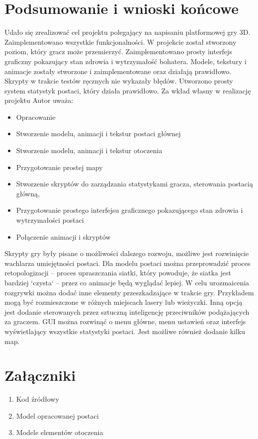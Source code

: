 \documentclass[12pt,twoside]{article}
\begin{document}
\clearpage
\section{Podsumowanie i wnioski końcowe}

Udało się zrealizować cel projektu polegający na napisaniu platformowej gry 3D.
Zaimplementowano wszystkie funkcjonalności. W projekcie został stworzony poziom,
który gracz może przemierzyć. Zaimplementowano prosty interfejs graficzny
pokazujący stan zdrowia i wytrzymałość bohatera. Modele, tekstury i animacje
zostały stworzone i zaimplementowane oraz działają prawidłowo. Skrypty w trakcie
testów ręcznych nie wykazały błędów. Utworzono prosty system statystyk postaci,
który działa prawidłowo. 
Za wkład własny w realizację projektu Autor uważa:
\begin{itemize}
\item Opracowanie
\item Stworzenie modelu, animacji i tekstur postaci głównej
\item Stworzenie modelu, animacji i tekstur otoczenia
\item Przygotowanie prostej mapy 
\item Stworzenie skryptów do zarządzania statystykami gracza, sterowania postacią główną, 
\item Przygotowanie prostego interfejsu graficznego pokazującego stan zdrowia i wytrzymałości postaci
\item Połączenie animacji i skryptów 
\end{itemize}

Skrypty gry były pisane o możliwości dalszego rozwoju, możliwe jest rozwinięcie
wachlarza umiejętności postaci.  Dla modelu postaci można przeprowadzić proces
retopologizacji -- proces upraszczania siatki, który powoduje, że siatka jest
bardziej `czysta` -- przez co animacje będą wyglądać lepiej. W celu urozmaicenia
rozgrywki można dodać inne elementy przeszkadzające w trakcie gry. Przykładem
mogą być rozmieszczone w różnych miejscach lasery lub wieżyczki. Inną opcją jest
dodanie sterowanych przez sztuczną inteligencję przeciwników podążających za
graczem. GUI można rozwinąć o menu główne, menu ustawień oraz interfejs
wyświetlający wszystkie statystyki postaci. Jest możliwe również dodanie kilku
map. 


\clearpage

\section*{Załączniki}
\begin{enumerate}
\item Kod źródłowy

\item Model opracowanej postaci

\item Modele elementów otoczenia
\end{enumerate}
\end{document}
